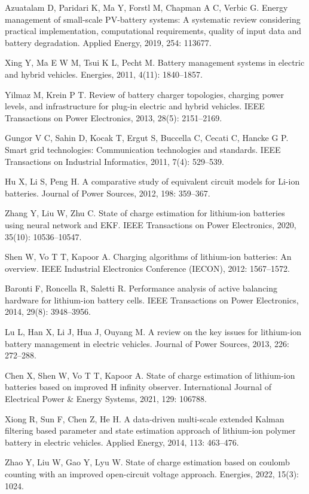 \begin{enumerate}[label={[\arabic*]}, leftmargin=*, itemsep=0.6ex]
  \item Azuatalam D, Paridari K, Ma Y, Forstl M, Chapman A C, Verbic G. Energy management of small-scale PV-battery systems: A systematic review considering practical implementation, computational requirements, quality of input data and battery degradation. Applied Energy, 2019, 254: 113677.
  \item Xing Y, Ma E W M, Tsui K L, Pecht M. Battery management systems in electric and hybrid vehicles. Energies, 2011, 4(11): 1840--1857.
  \item Yilmaz M, Krein P T. Review of battery charger topologies, charging power levels, and infrastructure for plug-in electric and hybrid vehicles. IEEE Transactions on Power Electronics, 2013, 28(5): 2151--2169.
  \item Gungor V C, Sahin D, Kocak T, Ergut S, Buccella C, Cecati C, Hancke G P. Smart grid technologies: Communication technologies and standards. IEEE Transactions on Industrial Informatics, 2011, 7(4): 529--539.
  \item Hu X, Li S, Peng H. A comparative study of equivalent circuit models for Li-ion batteries. Journal of Power Sources, 2012, 198: 359--367.
  \item Zhang Y, Liu W, Zhu C. State of charge estimation for lithium-ion batteries using neural network and EKF. IEEE Transactions on Power Electronics, 2020, 35(10): 10536--10547.
  \item Shen W, Vo T T, Kapoor A. Charging algorithms of lithium-ion batteries: An overview. IEEE Industrial Electronics Conference (IECON), 2012: 1567--1572.
  \item Baronti F, Roncella R, Saletti R. Performance analysis of active balancing hardware for lithium-ion battery cells. IEEE Transactions on Power Electronics, 2014, 29(8): 3948--3956.
  \item Lu L, Han X, Li J, Hua J, Ouyang M. A review on the key issues for lithium-ion battery management in electric vehicles. Journal of Power Sources, 2013, 226: 272--288.
  \item Chen X, Shen W, Vo T T, Kapoor A. State of charge estimation of lithium-ion batteries based on improved H infinity observer. International Journal of Electrical Power \& Energy Systems, 2021, 129: 106788.
  \item Xiong R, Sun F, Chen Z, He H. A data-driven multi-scale extended Kalman filtering based parameter and state estimation approach of lithium-ion polymer battery in electric vehicles. Applied Energy, 2014, 113: 463--476.
  \item Zhao Y, Liu W, Gao Y, Lyu W. State of charge estimation based on coulomb counting with an improved open-circuit voltage approach. Energies, 2022, 15(3): 1024.
\end{enumerate}


